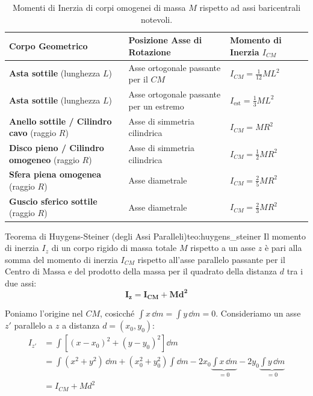 \begin{table}[htbp]
\centering
\caption{Momenti di Inerzia di corpi omogenei di massa $M$ rispetto ad assi baricentrali notevoli.}
\label{tab:momenti_inerzia}
\begin{tabularx}{\textwidth}{llX}
\toprule
\textbf{Corpo Geometrico} & \textbf{Posizione Asse di Rotazione} & \textbf{Momento di Inerzia $I_{CM}$} \\
\midrule
\textbf{Asta sottile} (lunghezza $L$) & Asse ortogonale passante per il $CM$ & $I_{CM} = \frac{1}{12}M L^2$ \\
\textbf{Asta sottile} (lunghezza $L$) & Asse ortogonale passante per un estremo & $I_{\text{est}} = \frac{1}{3}M L^2$ \\
\textbf{Anello sottile / Cilindro cavo} (raggio $R$) & Asse di simmetria cilindrica & $I_{CM} = M R^2$ \\
\textbf{Disco pieno / Cilindro omogeneo} (raggio $R$) & Asse di simmetria cilindrica & $I_{CM} = \frac{1}{2}M R^2$ \\
\textbf{Sfera piena omogenea} (raggio $R$) & Asse diametrale & $I_{CM} = \frac{2}{5}M R^2$ \\
\textbf{Guscio sferico sottile} (raggio $R$) & Asse diametrale & $I_{CM} = \frac{2}{3}M R^2$ \\
\bottomrule
\end{tabularx}
\end{table}

\begin{teorema}{Teorema di Huygens-Steiner (degli Assi Paralleli)}{teo:huygens_steiner}
Il momento di inerzia $I_z$ di un corpo rigido di massa totale $M$ rispetto a un asse $z$ è pari alla somma del momento di inerzia $I_{CM}$ rispetto all'asse parallelo passante per il Centro di Massa e del prodotto della massa per il quadrato della distanza $d$ tra i due assi:
\begin{equation}
    \mathbf{I_z = I_{CM} + M d^2}
    \label{eq:huygens_steiner}
\end{equation}
\end{teorema}

\begin{dimostrazione}
Poniamo l'origine nel $CM$, cosicché $\int x\,\dd m = \int y\,\dd m = 0$. Consideriamo un asse $z'$ parallelo a $z$ a distanza $d = (x_0, y_0)$:
\begin{align*}
    I_{z'} &= \int \left[(x - x_0)^2 + (y - y_0)^2\right]\dd m \\
    &= \int (x^2 + y^2)\,\dd m + (x_0^2 + y_0^2)\int \dd m - 2x_0 \underbrace{\int x\,\dd m}_{=0} - 2y_0 \underbrace{\int y\,\dd m}_{=0} \\
    &= I_{CM} + M d^2
\end{align*}
\end{dimostrazione}

